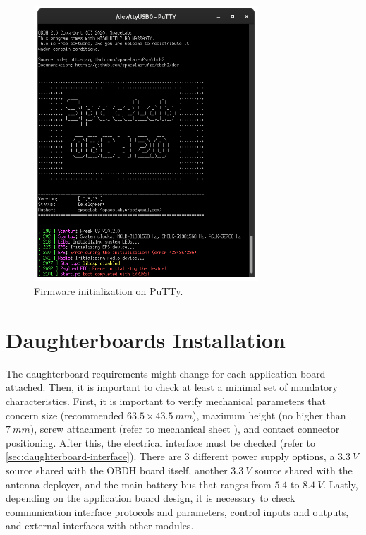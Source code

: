 \begin{figure}[!ht]
    \begin{center}
        \includegraphics[width=0.75\textwidth]{figures/putty-output.png}
        \caption{Firmware initialization on PuTTy.}
        \label{fig:putty-output}
    \end{center}
\end{figure}

\section{Daughterboards Installation}

The daughterboard requirements might change for each application board attached. Then, it is important to check at least a minimal set of mandatory characteristics. First, it is important to verify mechanical parameters that concern size (recommended $63.5 \times 43.5\ mm$), maximum height (no higher than $7\ mm$), screw attachment (refer to mechanical sheet \cite{obdh2-draftsman}), and contact connector positioning. After this, the electrical interface must be checked (refer to \autoref{sec:daughterboard-interface}). There are 3 different power supply options, a $3.3\ V$ source shared with the OBDH board itself, another $3.3\ V$ source shared with the antenna deployer, and the main battery bus that ranges from $5.4$ to $8.4\ V$. Lastly, depending on the application board design, it is necessary to check communication interface protocols and parameters, control inputs and outputs, and external interfaces with other modules.
